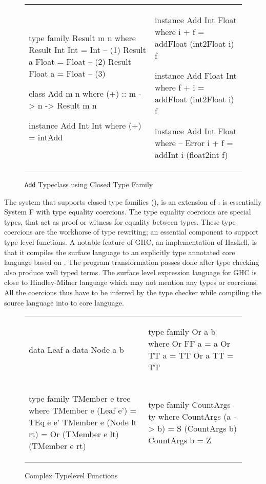 \documentclass[format=acmsmall,manuscript,review,screen,nonacm,margin=1in,11pt]{acmart}
\begin{document}
\begin{figure}[ht]
    \footnotesize
  \begin{tabular}{l l}
\begin{code}
type family Result m n where
  Result Int Int = Int   -- (1)
  Result a Float = Float -- (2)
  Result Float a = Float -- (3)

class Add m n where
  (+) :: m -> n -> Result m n

instance Add Int Int where
  (+) = intAdd
\end{code}&%
\begin{code}
instance Add Int Float where
  i + f = addFloat (int2Float i) f

instance Add Float Int where
  f + i = addFloat (int2Float i) f

instance Add Int Float where -- Error
  i + f = addInt i (float2int f)
    \end{code}
  \end{tabular}
  \caption{\texttt{Add} Typeclass using Closed Type Family}
  \label{fig:add-ty-fam}
\end{figure}
The system that supports closed type families (\CLTF{}), is an extension of \FC\cite{sulzmann_system_2007}.
\FC is essentially System F\cite{girard_proofs_1989,reynolds_towards_1974} with type equality coercions.
The type equality coercions are special types, that act as proof or witness
for equality between types. These type coercions are the workhorse of type rewriting;
an essential component to support type level functions.
A notable feature of GHC, an implementation of Haskell, is that it compiles the surface language
to an explicitly type annotated core language based on \FC. The program transformation
passes done after type checking also produce well typed \FC terms. The surface level expression
language for GHC is close to Hindley-Milner language which may not mention any types or coercions.
All the coercions thus have to be inferred by the type checker while compiling
the source language into to core language. 
\begin{figure}[ht]
  \footnotesize
  \begin{tabular}{l l}
\begin{code}
data Leaf a
data Node a b
\end{code}&%
\begin{code}
type family Or a b where
  Or FF a = a
  Or TT a = TT
  Or a TT = TT
\end{code}\\
\begin{code}
type family TMember e tree where
  TMember e (Leaf e') = TEq e e'
  TMember e (Node lt rt)
    = Or (TMember e lt) (TMember e rt)
\end{code}&%
\begin{code}
type family CountArgs ty where
  CountArgs (a -> b) = S (CountArgs b)
  CountArgs b        = Z
\end{code}
  \end{tabular}
  \caption{Complex Typelevel Functions}
  \label{fig:tf-closed-examples}
\end{figure}
\end{document}
